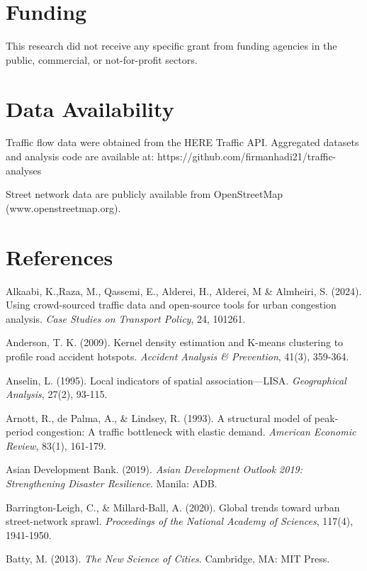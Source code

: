 \documentclass[12pt,a4paper]{article}
\begin{document}
\section*{Funding}

This research did not receive any specific grant from funding agencies in the public, commercial, or not-for-profit sectors.



\section*{Data Availability}

Traffic flow data were obtained from the HERE Traffic API. Aggregated datasets and analysis code are available at: https://github.com/firmanhadi21/traffic-analyses

Street network data are publicly available from OpenStreetMap (www.openstreetmap.org).



\section*{References}

Alkaabi, K.,Raza, M., Qassemi, E., Alderei, H., Alderei, M \& Almheiri, S. (2024). Using crowd-sourced traffic data and open-source tools for urban congestion analysis. \emph{Case Studies on Transport Policy}, 24, 101261.

Anderson, T. K. (2009). Kernel density estimation and K-means clustering to profile road accident hotspots. \emph{Accident Analysis \& Prevention}, 41(3), 359-364.

Anselin, L. (1995). Local indicators of spatial association---LISA. \emph{Geographical Analysis}, 27(2), 93-115.

Arnott, R., de Palma, A., \& Lindsey, R. (1993). A structural model of peak-period congestion: A traffic bottleneck with elastic demand. \emph{American Economic Review}, 83(1), 161-179.

Asian Development Bank. (2019). \emph{Asian Development Outlook 2019: Strengthening Disaster Resilience}. Manila: ADB.

Barrington-Leigh, C., \& Millard-Ball, A. (2020). Global trends toward urban street-network sprawl. \emph{Proceedings of the National Academy of Sciences}, 117(4), 1941-1950.

Batty, M. (2013). \emph{The New Science of Cities}. Cambridge, MA: MIT Press.
\end{document}
